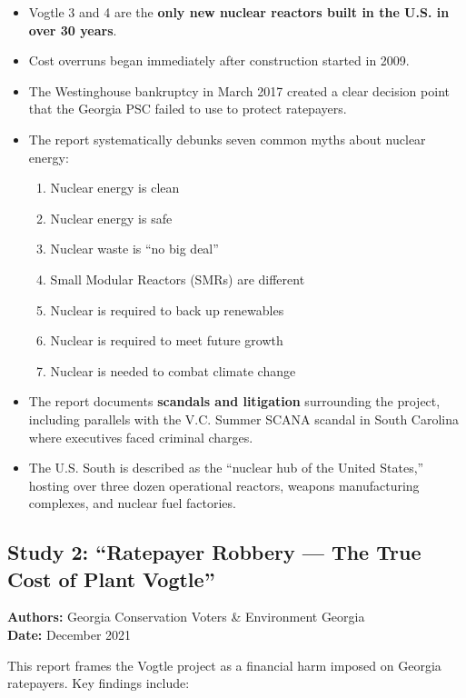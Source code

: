 \documentclass[12pt,a4paper]{article}
\begin{document}
\begin{itemize}
    \item Vogtle 3 and 4 are the \textbf{only new nuclear reactors built in the U.S. in
          over 30 years}.
    \item Cost overruns began immediately after construction started in 2009.
    \item The Westinghouse bankruptcy in March 2017 created a clear decision point
          that the Georgia PSC failed to use to protect ratepayers.
    \item The report systematically debunks seven common myths about nuclear energy:
    \begin{enumerate}
        \item Nuclear energy is clean
        \item Nuclear energy is safe
        \item Nuclear waste is ``no big deal''
        \item Small Modular Reactors (SMRs) are different
        \item Nuclear is required to back up renewables
        \item Nuclear is required to meet future growth
        \item Nuclear is needed to combat climate change
    \end{enumerate}
    \item The report documents \textbf{scandals and litigation} surrounding the project,
          including parallels with the V.C. Summer SCANA scandal in South Carolina
          where executives faced criminal charges.
    \item The U.S. South is described as the ``nuclear hub of the United States,''
          hosting over three dozen operational reactors, weapons manufacturing complexes,
          and nuclear fuel factories.
\end{itemize}

\subsection{Study 2: ``Ratepayer Robbery --- The True Cost of Plant Vogtle''}

\textbf{Authors:} Georgia Conservation Voters \& Environment Georgia\\
\textbf{Date:} December 2021

This report frames the Vogtle project as a financial harm imposed on Georgia
ratepayers. Key findings include:
\end{document}
